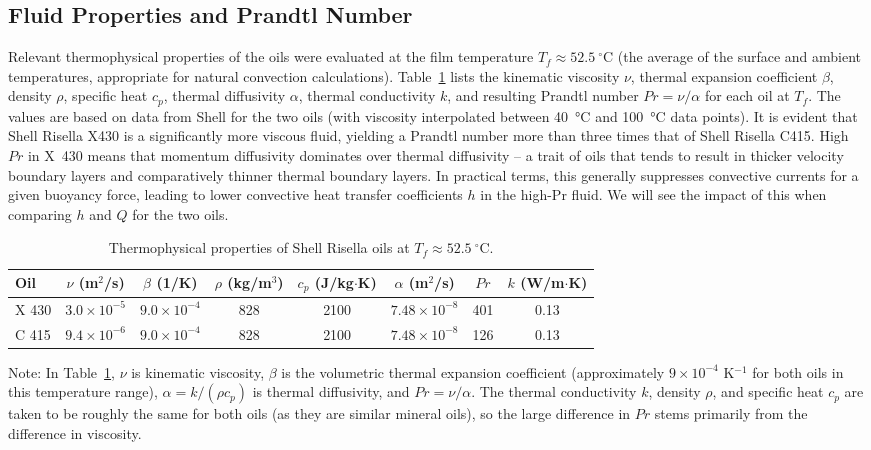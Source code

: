 \documentclass[12pt]{article}
\begin{document}
\subsection{Fluid Properties and Prandtl Number}
Relevant thermophysical properties of the oils were evaluated at the film temperature $T_f \approx 52.5~^\circ\text{C}$ (the average of the surface and ambient temperatures, appropriate for natural convection calculations). Table~\ref{tab:properties} lists the kinematic viscosity $\nu$, thermal expansion coefficient $\beta$, density $\rho$, specific heat $c_p$, thermal diffusivity $\alpha$, thermal conductivity $k$, and resulting Prandtl number $\textit{Pr} = \nu/\alpha$ for each oil at $T_f$. The values are based on data from Shell for the two oils (with viscosity interpolated between 40~°C and 100~°C data points). It is evident that Shell Risella X430 is a significantly more viscous fluid, yielding a Prandtl number more than three times that of Shell Risella C415. High $\textit{Pr}$ in X~430 means that momentum diffusivity dominates over thermal diffusivity – a trait of oils that tends to result in thicker velocity boundary layers and comparatively thinner thermal boundary layers. In practical terms, this generally suppresses convective currents for a given buoyancy force, leading to lower convective heat transfer coefficients $h$ in the high-Pr fluid. We will see the impact of this when comparing $h$ and $Q$ for the two oils.

\begin{table}[h!]
\centering
\caption{Thermophysical properties of Shell Risella oils at $T_f \approx 52.5~^\circ\text{C}$.}
\label{tab:properties}
\begin{tabular}{lccccccc}
\toprule
Oil & $\nu$ (m$^2$/s) & $\beta$ (1/K) & $\rho$ (kg/m$^3$) & $c_p$ (J/kg$\cdot$K) & $\alpha$ (m$^2$/s) & $Pr$ & $k$ (W/m$\cdot$K) \\
\midrule
 X 430 & $3.0\times10^{-5}$ & $9.0\times10^{-4}$ & 828 & 2100 & $7.48\times10^{-8}$ & 401 & 0.13 \\
 C 415 & $9.4\times10^{-6}$ & $9.0\times10^{-4}$ & 828 & 2100 & $7.48\times10^{-8}$ & 126 & 0.13 \\
\bottomrule
\end{tabular}
\end{table}

Note: In Table~\ref{tab:properties}, $\nu$ is kinematic viscosity, $\beta$ is the volumetric thermal expansion coefficient (approximately $9\times10^{-4}$ K$^{-1}$ for both oils in this temperature range), $\alpha = k/(\rho c_p)$ is thermal diffusivity, and $Pr = \nu/\alpha$. The thermal conductivity $k$, density $\rho$, and specific heat $c_p$ are taken to be roughly the same for both oils (as they are similar mineral oils), so the large difference in $Pr$ stems primarily from the difference in viscosity.
\end{document}
